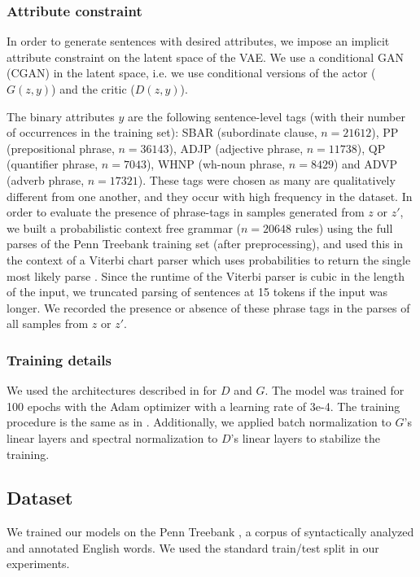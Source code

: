\documentclass[11pt,letterpaper]{article}
\begin{document}
\subsubsection{Attribute constraint}
In order to generate sentences with desired attributes, we impose an implicit attribute constraint on the latent space of the VAE. We use a conditional GAN (CGAN) \cite{mirza2014conditional} in the latent space, i.e. we use conditional versions of the actor ($G(z,y)$) and the critic ($D(z,y)$). 

The binary attributes $y$ are the following sentence-level tags (with their number of occurrences in the training set): SBAR (subordinate clause, $n=21612$), PP (prepositional phrase, $n=36143$), ADJP (adjective phrase, $n=11738$), QP (quantifier phrase, $n=7043$), WHNP (wh-noun phrase, $n=8429$) and ADVP (adverb phrase, $n=17321$). These tags were chosen as many are qualitatively different from one another, and they occur with high frequency in the dataset. In order to evaluate the presence of phrase-tags in samples generated from $z$ or $z'$, we built a probabilistic context free grammar ($n=20648$ rules) using the full parses of the Penn Treebank training set (after preprocessing), and used this in the context of a Viterbi chart parser which uses probabilities to return the single most likely parse \cite{klein2003parsing}. Since the runtime of the Viterbi parser is cubic in the length of the input, we truncated parsing of sentences at 15 tokens if the input was longer. We recorded the presence or absence of these phrase tags in the parses of all samples from $z$ or $z'$.

\subsubsection{Training details}
We used the architectures described in \cite{engel2017latent} for $D$ and $G$. The model was trained for 100 epochs with the Adam optimizer \cite{kingma2014adam} with a learning rate of 3e-4. The training procedure is the same as in \cite{gulrajani2017improved}. Additionally, we applied batch normalization \cite{ioffe2015batch} to $G$'s linear layers and spectral normalization \cite{miyato2018spectral} to $D$'s linear layers to stabilize the training. 

\subsection{Dataset}
We trained our models on the Penn Treebank \cite{marcus1993building}, a corpus of syntactically analyzed and annotated English words. We used the standard train/test split in our experiments.
\end{document}
